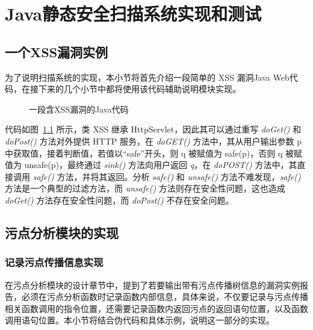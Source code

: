 \chapter{Java静态安全扫描系统实现和测试}
\section{一个XSS漏洞实例}
为了说明扫描系统的实现，本小节将首先介绍一段简单的 XSS 漏洞Java Web代码，在接下来的几个小节中都将使用该代码辅助说明模块实现。

\begin{figure}[!htbp]
    \noindent
    \centering
    \begin{minipage}[!htbp]{0.9\textwidth}
        
    \end{minipage}
    \caption{一段含XSS漏洞的Java代码}\label{code:xss}
\end{figure}

代码如图~\ref{code:xss} 所示，类 XSS 继承 HttpServlet，因此其可以通过重写 \textit{doGet()} 和 \textit{doPost()} 方法对外提供 HTTP 服务，在 \textit{doGET()} 方法中，其从用户输出参数 p 中获取值，接着判断值，若值以“safe”开头，则 q 被赋值为 safe(p)，否则 q 被赋值为 unsafe(p)，最终通过 \textit{sink()} 方法向用户返回 \textit{q}，在 \textit{doPOST()} 方法中，其直接调用 \textit{safe()} 方法，并将其返回。分析 \textit{safe()} 和 \textit{unsafe()} 方法不难发现，\textit{safe()} 方法是一个典型的过滤方法，而 \textit{unsafe()} 方法则存在安全性问题，这也造成 \textit{doGet()} 方法存在安全性问题，而 \textit{doPost()} 不存在安全问题。

\section{污点分析模块的实现}\label{sec:taintImp}
\subsection{记录污点传播信息实现}
在污点分析模块的设计章节中，提到了若要输出带有污点传播树信息的漏洞实例报告，必须在污点分析函数时记录函数内部信息，具体来说，不仅要记录与污点传播相关函数调用的指令位置，还需要记录函数内返回污点的返回语句位置，以及函数调用语句位置。本小节将结合伪代码和具体示例，说明这一部分的实现。

